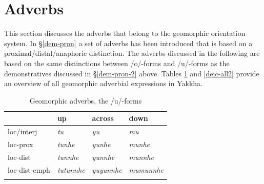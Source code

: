 \section{Adverbs}\label{geodeixis}

This section discusses the adverbs that belong to the geomorphic  orientation system. In §\ref{dem-pron} a set of adverbs has been introduced that is based on a proximal/distal/anaphoric distinction. The adverbs discussed in the following are based on the same distinctions between /o/-forms and /u/-forms as the demonstratives discussed in §\ref{dem-pron-2} above. 
Tables \ref{deic-all1} and \ref{deic-all2}  provide an overview of all geomorphic adverbial expressions in Yakkha. 
	 	  
 \begin{table}[htp]
\begin{centering}
\begin{tabular}{llll}
\lsptoprule
									&{\sc up}		&{\sc across}&{\sc down}\\
\midrule
			{\sc loc/interj}	&\emph{tu}&\emph{yu}&\emph{mu}\\
			{\sc loc-prox}&\emph{tunhe}&\emph{yunhe}&\emph{munhe}\\
			{\sc loc-dist}&\emph{tunnhe}&\emph{yunnhe}&\emph{munnhe}\\
			{\sc loc-dist-emph}&\emph{tutunnhe}&\emph{yuyunnhe}&\emph{mumunnhe}\\
\lspbottomrule
\end{tabular} 
\caption{Geomorphic adverbs, the /u/-forms}\label{deic-all1}
\end{centering}
\end{table}

